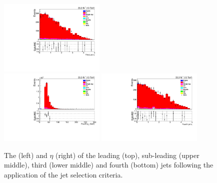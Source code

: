 \begin{figure}[ht]
\includegraphics[width=0.45\textwidth]{figs/background-estimation/plots/unblinded/ttbar_control/thirdJetEta_SingleTop_jetSel_emu.pdf}
\\
\includegraphics[width=0.45\textwidth]{figs/background-estimation/plots/unblinded/ttbar_control/fourthJetPt_SingleTop_jetSel_emu.pdf}
\includegraphics[width=0.45\textwidth]{figs/background-estimation/plots/unblinded/ttbar_control/fourthJetEta_SingleTop_jetSel_emu.pdf}
\caption{
The \pT (left) and $\eta$ (right) of the leading (top), sub-leading (upper middle), third (lower middle) and fourth (bottom) jets following the application of the jet selection criteria.
}
\label{fig:App_ttbar_jetsKinematics_jetCuts}
\end{figure}

